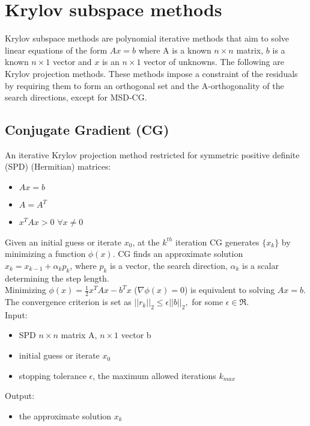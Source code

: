 \documentclass[]{scrartcl}
\title{}
\author{Kafa Alameh}
\begin{document}
\maketitle

\begin{abstract}

\end{abstract}

\section{Krylov subspace methods}
Krylov subspace methods are polynomial iterative methods that aim to solve linear equations of the form $Ax=b$ where A is a known $n \times n$ matrix, $b$ is a known $n \times 1$ vector and $x$ is an $n \times 1$ vector of unknowns. The following are Krylov projection methods. These methods impose a constraint of the residuals by requiring them to form an orthogonal set and the A-orthogonality of the search directions, except for MSD-CG.
\subsection{Conjugate Gradient (CG)}
An iterative Krylov projection method restricted for symmetric positive definite (SPD) (Hermitian) matrices:
\begin{itemize}
	\item $Ax=b$
	\item $A=A^{T}$
	\item $x^{T}Ax>0$ $\forall x \neq 0$
\end{itemize}
Given an initial guess or iterate $x_{0}$, at the $k^{th}$ iteration CG generates $\{x_{k}\}$ by minimizing a function $\phi(x)$. CG finds an approximate solution $x_{k}=x_{k-1}+\alpha_{k}p_{k}$, where $p_{k}$ is a vector, the search direction, $\alpha_{k}$ is a scalar determining the step length. \\ Minimizing $\phi(x)=\frac{1}{2}x^{T}Ax-b^{T}x$ ($\nabla \phi(x)=0$) is equivalent to solving $Ax=b$. \\ The convergence criterion is set as $||r_{k}||_{2} \leq \epsilon||b||_{2},$ for some $\epsilon \in \Re.$ \\
Input: 
\begin{itemize}
	\item SPD $n\times n$ matrix A, $n\times 1$ vector b
	\item initial guess or iterate $x_{0}$
	\item stopping tolerance $\epsilon$, the maximum allowed iterations $k_{max}$ 
\end{itemize}
Output:
\begin{itemize}
	\item the approximate solution $x_{k}$ 
\end{itemize}
\end{document}
